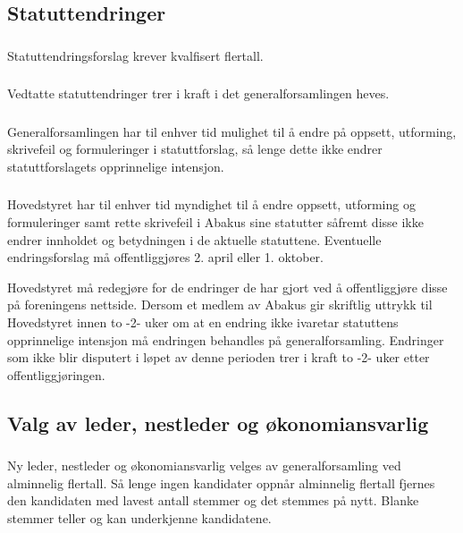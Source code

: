 \subsection{Statuttendringer}
\subsubsection{}
Statuttendringsforslag krever kvalfisert flertall.

\subsubsection{}
Vedtatte statuttendringer trer i kraft i det generalforsamlingen heves.

\subsubsection{}
Generalforsamlingen har til enhver tid mulighet til å endre på oppsett,
utforming, skrivefeil og formuleringer i statuttforslag, så lenge dette ikke
endrer statuttforslagets opprinnelige intensjon.

\subsubsection{}
Hovedstyret har til enhver tid myndighet til å endre oppsett, utforming og
formuleringer samt rette skrivefeil i Abakus sine statutter såfremt disse ikke
endrer innholdet og betydningen i de aktuelle statuttene. Eventuelle
endringsforslag må offentliggjøres 2. april eller 1. oktober.

Hovedstyret må redegjøre for de endringer de har gjort ved å offentliggjøre
disse på foreningens nettside. Dersom et medlem av Abakus gir skriftlig uttrykk
til Hovedstyret innen to -2- uker om at en endring ikke ivaretar statuttens
opprinnelige intensjon må endringen behandles på generalforsamling. Endringer
som ikke blir disputert i løpet av denne perioden trer i kraft to -2- uker
etter offentliggjøringen.

\subsection{Valg av leder, nestleder og økonomiansvarlig}
\subsubsection{}
Ny leder, nestleder og økonomiansvarlig velges av generalforsamling ved
alminnelig flertall. Så lenge ingen kandidater oppnår alminnelig flertall
fjernes den kandidaten med lavest antall stemmer og det stemmes på nytt. Blanke
stemmer teller og kan underkjenne kandidatene.

